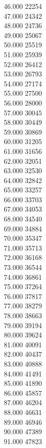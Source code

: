{ 46.000	22254 \\
 47.000	24342 \\
 48.000	24736 \\
 49.000	25067 \\
 50.000	25519 \\
 51.000	25939 \\
 52.000	26412 \\
 53.000	26793 \\
 54.000	27174 \\
 55.000	27500 \\
 56.000	28000 \\
 57.000	30045 \\
 58.000	30449 \\
 59.000	30869 \\
 60.000	31205 \\
 61.000	31656 \\
 62.000	32051 \\
 63.000	32530 \\
 64.000	32842 \\
 65.000	33257 \\
 66.000	33703 \\
 67.000	34053 \\
 68.000	34540 \\
 69.000	34884 \\
 70.000	35347 \\
 71.000	35713 \\
 72.000	36168 \\
 73.000	36544 \\
 74.000	36861 \\
 75.000	37264 \\
 76.000	37817 \\
 77.000	38279 \\
 78.000	38663 \\
 79.000	39194 \\
 80.000	39624 \\
 81.000	40091 \\
 82.000	40437 \\
 83.000	40888 \\
 84.000	41491 \\
 85.000	41890 \\
 86.000	45857 \\
 87.000	46204 \\
 88.000	46631 \\
 89.000	46946 \\
 90.000	47389 \\
 91.000	47823 \\
}
